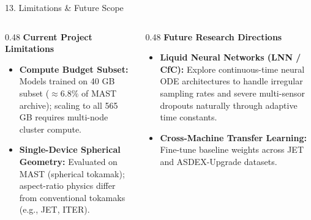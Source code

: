 \documentclass[aspectratio=169, 10pt]{beamer}
\begin{document}
\begin{frame}{13. Limitations \& Future Scope}
  \begin{columns}[T]
    \begin{column}{0.48\textwidth}
      \textbf{\color{NavyBlue} Current Project Limitations}
      \begin{itemize}
        \item \textbf{Compute Budget Subset:}
          Models trained on 40 GB subset ($\approx 6.8\%$ of MAST archive); scaling to all 565 GB requires multi-node cluster compute.
        \item \textbf{Single-Device Spherical Geometry:}
          Evaluated on MAST (spherical tokamak); aspect-ratio physics differ from conventional tokamaks (e.g., JET, ITER).
      \end{itemize}
    \end{column}

    \begin{column}{0.48\textwidth}
      \textbf{\color{NavyBlue} Future Research Directions}
      \begin{itemize}
        \item \textbf{Liquid Neural Networks (LNN / CfC):}
          Explore continuous-time neural ODE architectures to handle irregular sampling rates and severe multi-sensor dropouts naturally through adaptive time constants.
        \item \textbf{Cross-Machine Transfer Learning:}
          Fine-tune baseline weights across JET and ASDEX-Upgrade datasets.
      \end{itemize}
    \end{column}
  \end{columns}
\end{frame}
\end{document}
